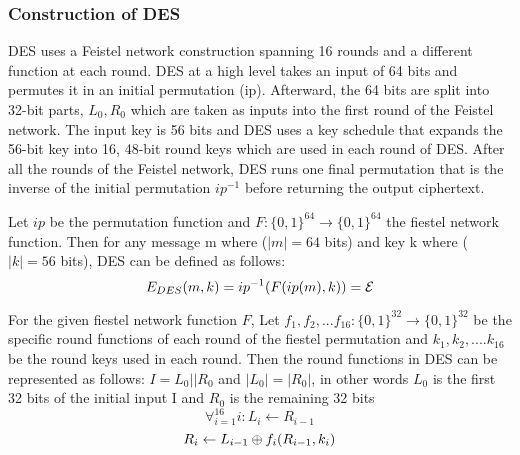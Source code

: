 

\newpage

\subsubsection*{Construction of DES} DES uses a Feistel network construction spanning 16 rounds and a different function at each round. DES at a high level takes an input of 64 bits and permutes it in an initial permutation (ip). Afterward, the 64 bits are split into 32-bit parts, \( L_0, R_0\) which are taken as inputs into the first round of the Feistel network. The input key is 56 bits and DES uses a key schedule that expands the 56-bit key into 16, 48-bit round keys which are used in each round of DES. After all the rounds of the Feistel network, DES runs one final permutation that is the inverse of the initial permutation $ip^{-1}$ before returning the output ciphertext. \newline \newline


Let $ip$ be the permutation function and $F : \{0,1\}^{64} \to \{0,1\}^{64}$ the fiestel network function. Then for any message m where (\( |m| = 64 \) bits) and key k where (\( |k| = 56 \) bits), DES can be defined as follows:
	\[ {E}_{DES} (m,k) = {ip}^{-1}(F({ip}(m), k)) = {\cal E} \] 


 For the given fiestel network function $F$, Let $f_1, f_2, ... f_{16} : \{0,1\}^{32} \to \{0,1\}^{32}$ be the specific round functions of each round of the fiestel permutation and \(k_1, k_2, .... k_16 \) be the round keys used in each round. Then the round functions in DES can be represented as follows: \newline
\( I = L_0 || R_0 \)  and \(|L_0| = |R_0|\), in other words $L_0$ is the first 32 bits of the initial input I and $R_0$ is the remaining 32 bits  \newline
\[\forall^{16}_{i=1} i : L_i \leftarrow R_{i-1} \] \[ R_i \leftarrow L_{i-1} {\:\oplus\:} {f_i}(R_{i-1}, k_i) \]


